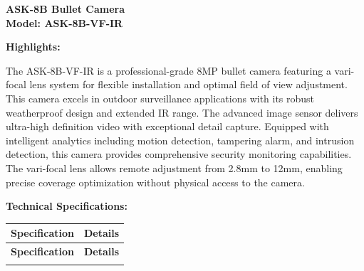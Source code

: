 \documentclass[11pt,a4paper]{article}
\newcommand{\ProductSpecPage}[4]{%
    \newpage
    \thispagestyle{fancy}
    
    \begin{center}
        \vspace*{0.5cm}
        {\Huge\bfseries #1}\\[0.3cm]
        {\Large\bfseries Model: #2}\\[0.5cm]
    \end{center}
    
    \vspace{0.3cm}
    \noindent\textbf{\large Highlights:}\\[0.2cm]
    \noindent\parbox{\textwidth}{#3}
    \vspace{0.5cm}
    
    \noindent\textbf{\large Technical Specifications:}\\[0.3cm]
    #4
    
    \vfill
}
\begin{document}
\ProductSpecPage{ASK-8B Bullet Camera}{ASK-8B-VF-IR}{%
The ASK-8B-VF-IR is a professional-grade 8MP bullet camera featuring a vari-focal lens system for flexible installation and optimal field of view adjustment. This camera excels in outdoor surveillance applications with its robust weatherproof design and extended IR range. The advanced image sensor delivers ultra-high definition video with exceptional detail capture. Equipped with intelligent analytics including motion detection, tampering alarm, and intrusion detection, this camera provides comprehensive security monitoring capabilities. The vari-focal lens allows remote adjustment from 2.8mm to 12mm, enabling precise coverage optimization without physical access to the camera.
}{%
\begin{longtable}{@{}p{4cm}X@{}}
\toprule
\textbf{Specification} & \textbf{Details} \\
\midrule
\endfirsthead
\toprule
\textbf{Specification} & \textbf{Details} \\
\midrule
\endhead
\bottomrule
\endfoot
\bottomrule
\endlastfoot


\end{longtable}}
\end{document}
